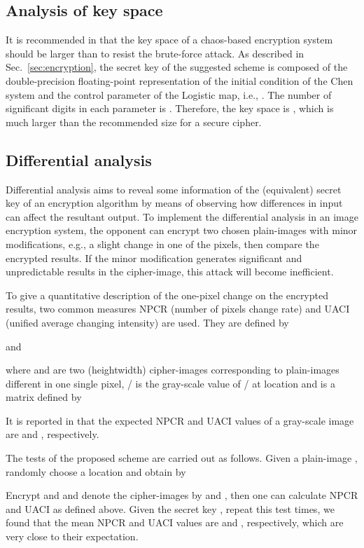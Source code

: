 \documentclass[3p,preprint,11pt]{elsarticle}
\begin{document}
\subsection{Analysis of key space}
It is recommended in \cite{shujun:BasicRrequirement:IJBC06} that the key space of a chaos-based encryption system
should be larger than  to resist the brute-force attack.
As described in Sec.~\ref{sec:encryption}, the secret key
of the suggested scheme is composed of the double-precision floating-point representation of the initial condition of the Chen
system and the control parameter of the Logistic map, i.e., .
The number of significant digits in each parameter is .
Therefore, the key space is , which is much larger
than the recommended size for a secure cipher.

\subsection{Differential analysis}
Differential analysis aims to reveal some information of the (equivalent) secret key of an encryption
algorithm by means of observing how differences in input can affect the resultant output.
To implement the differential
analysis in an image encryption system, the opponent can encrypt two chosen plain-images
with minor modifications, e.g., a slight change in one of the pixels, then compare the encrypted results.
If the minor modification generates significant and unpredictable results in the cipher-image,
this attack will become inefficient.

To give a quantitative description of the one-pixel change on the encrypted results, two common measures
NPCR (number of pixels change rate) and UACI (unified average changing intensity) are used. They are defined
by

and

where  and  are two  (heightwidth) cipher-images corresponding to
plain-images different in one single pixel, / is the gray-scale value of /
at location  and  is a matrix defined by

It is reported in \cite{Zhu:HyperEnc:OC12} that the expected NPCR and UACI values of a 
gray-scale image are  and , respectively.

The tests of the proposed scheme are carried out as follows. Given a plain-image , randomly choose
a location  and obtain  by

Encrypt  and  and denote the cipher-images by  and , then one can calculate NPCR and UACI as defined above.
Given the secret key , repeat this test  times,
we found that the mean NPCR and UACI values are  and , respectively,
which are very close to their expectation.
\end{document}
